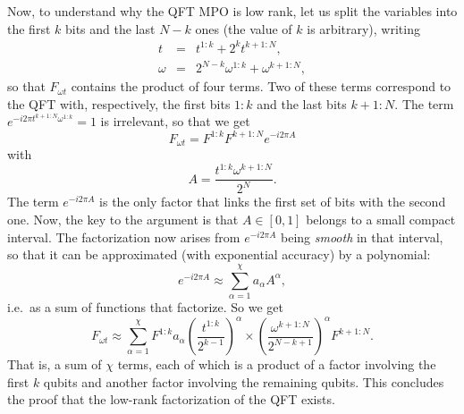 \documentclass{SciPost}
\begin{document}
Now, to understand why the QFT MPO is low rank, let us split the variables into the first $k$ bits and the last $N-k$ ones (the value of $k$ is arbitrary), writing
\begin{eqnarray}
t &=& t^{1:k} + 2^{k} t^{k+1:N}, \\
\omega &=& 2^{N-k}\omega^{1:k} + \omega^{k+1:N},
\end{eqnarray}
so that $F_{\omega t}$ contains the product of four terms. Two of these terms correspond to the QFT with, respectively, the first bits $1:k$ and the last bits $k+1:N$. The term $e^{-i2\pi t^{k+1:N}\omega^{1:k}}=1$ is irrelevant, so that we get
\begin{equation}
F_{\omega t} = F^{1:k} F^{k+1:N} e^{-i2\pi A}
\end{equation}
with
\begin{equation}
A = \frac{t^{1:k}\omega^{k+1:N}}{2^N}.
\end{equation}
The term $e^{-i2\pi A}$ is the only factor that links the first set of bits with the second one. Now, the key to the argument is that $A\in [0,1]$ belongs to a small compact interval. The factorization now arises from $e^{-i2\pi A}$ being \emph{smooth} in that interval, so that it can be approximated (with exponential accuracy) by a polynomial:
\begin{equation}
e^{-i2\pi A}\approx\sum_{\alpha=1}^\chi a_\alpha A^\alpha,
\end{equation}
i.e.\ as a sum of functions that factorize. So we get
\begin{equation}
F_{\omega t} \approx \sum_{\alpha=1}^\chi
F^{1:k} a_\alpha \left(\frac{t^{1:k}}{2^{k-1}}\right)^\alpha
\times
\left(\frac{\omega^{k+1:N}}{2^{N-k+1}}\right)^\alpha F^{k+1:N}.
\end{equation}
That is, a sum of $\chi$ terms, each of which is a product of a factor involving the first $k$ qubits and another factor involving the remaining qubits. This concludes the proof that the low-rank factorization of the QFT exists.
\end{document}
